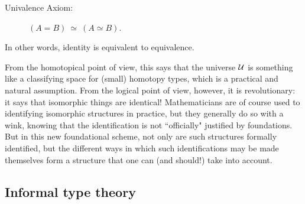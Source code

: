 {\begin{description}
\item[Univalence Axiom:]  $(A = B)\ \simeq\ (A\simeq B)$.
\end{description}
%
In other words, identity is equivalent to equivalence. 

From the homotopical point of view, this says that the universe ${\mathcal U}$ is something like a classifying space for (small) homotopy types, which is a practical and natural assumption.  From the  logical point of view, however, it is revolutionary: it says that isomorphic things are identical!  Mathematicians are of course used to identifying isomorphic structures in practice, but they generally do so with a wink, knowing that the identification is not ``officially" justified by foundations.  But in this new foundational scheme, not only are such structures formally identified, but the different ways in which such identifications may be made themselves form a structure that one can (and should!) take into account.


\subsection*{Informal type theory}

}
